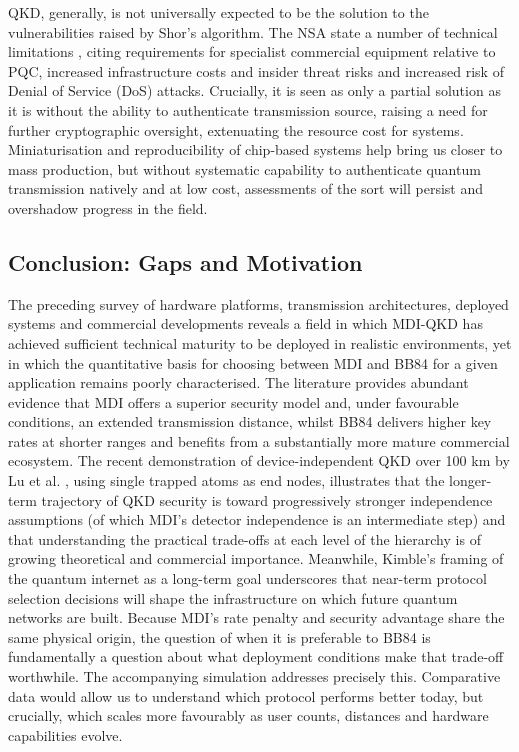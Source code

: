 \documentclass[9pt,technote]{IEEEtran}
\begin{document}
QKD, generally, is not universally expected to be the solution to the vulnerabilities raised by Shor's algorithm. The NSA state a number of technical limitations \cite{NSA}, citing requirements for specialist commercial equipment relative to PQC, increased infrastructure costs and insider threat risks and increased risk of Denial of Service (DoS) attacks. Crucially, it is seen as only a partial solution as it is without the ability to authenticate transmission source, raising a need for further cryptographic oversight, extenuating the resource cost for systems. Miniaturisation and reproducibility of chip-based systems help bring us closer to mass production, but without systematic capability to authenticate quantum transmission natively and at low cost, assessments of the sort will persist and overshadow progress in the field.

\subsection*{Conclusion: Gaps and Motivation}

The preceding survey of hardware platforms, transmission architectures, deployed systems and commercial developments reveals a field in which MDI-QKD has achieved sufficient technical maturity to be deployed in realistic environments, yet in which the quantitative basis for choosing between MDI and BB84 for a given application remains poorly characterised. The literature provides abundant evidence that MDI offers a superior security model and, under favourable conditions, an extended transmission distance, whilst BB84 delivers higher key rates at shorter ranges and benefits from a substantially more mature commercial ecosystem. The recent demonstration of device-independent QKD over 100 km by Lu et al. \cite{Lu2026}, using single trapped atoms as end nodes, illustrates that the longer-term trajectory of QKD security is toward progressively stronger independence assumptions (of which MDI's detector independence is an intermediate step) and that understanding the practical trade-offs at each level of the hierarchy is of growing theoretical and commercial importance. Meanwhile, Kimble's framing of the quantum internet \cite{Kimble_2008} as a long-term goal underscores that near-term protocol selection decisions will shape the infrastructure on which future quantum networks are built. Because MDI's rate penalty and security advantage share the same physical origin, the question of when it is preferable to BB84 is fundamentally a question about what deployment conditions make that trade-off worthwhile. The accompanying simulation addresses precisely this. Comparative data would allow us to understand which protocol performs better today, but crucially, which scales more favourably as user counts, distances and hardware capabilities evolve.



\end{document}

